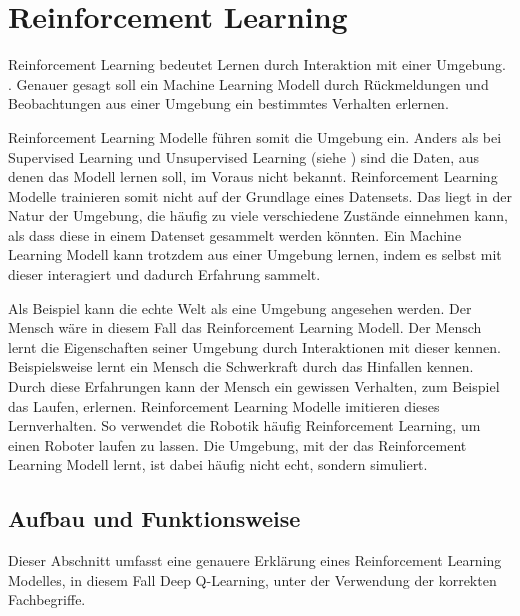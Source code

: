 \section{Reinforcement Learning}\label{chap:t_rl}
Reinforcement Learning bedeutet Lernen durch Interaktion mit einer Umgebung.
\cite{osinski_what_2018}. Genauer gesagt soll ein Machine Learning Modell durch
Rückmeldungen und Beobachtungen aus einer Umgebung ein bestimmtes Verhalten
erlernen.

Reinforcement Learning Modelle führen somit die Umgebung ein. Anders als bei
Supervised Learning und Unsupervised Learning (siehe ) sind
die Daten, aus denen das Modell lernen soll, im Voraus nicht bekannt.
Reinforcement Learning Modelle trainieren somit nicht auf der Grundlage eines
Datensets. Das liegt in der Natur der Umgebung, die häufig zu viele verschiedene
Zustände einnehmen kann, als dass diese in einem Datenset gesammelt werden
könnten. Ein Machine Learning Modell kann trotzdem aus einer Umgebung lernen,
indem es selbst mit dieser interagiert und dadurch Erfahrung sammelt.
\cite{piyush_verma_what_2021}

Als Beispiel kann die echte Welt als eine Umgebung angesehen werden. Der Mensch
wäre in diesem Fall das Reinforcement Learning Modell. Der Mensch lernt die
Eigenschaften seiner Umgebung durch Interaktionen mit dieser kennen.
Beispielsweise lernt ein Mensch die Schwerkraft durch das Hinfallen kennen.
Durch diese Erfahrungen kann der Mensch ein gewissen Verhalten, zum Beispiel das
Laufen, erlernen. Reinforcement Learning Modelle imitieren dieses Lernverhalten.
So verwendet die Robotik häufig Reinforcement Learning, um einen Roboter laufen
zu lassen. Die Umgebung, mit der das Reinforcement Learning Modell lernt, ist
dabei häufig nicht echt, sondern simuliert.

\subsection{Aufbau und Funktionsweise}\label{sub:t_rl_func}
Dieser Abschnitt umfasst eine genauere Erklärung eines Reinforcement Learning
Modelles, in diesem Fall Deep Q-Learning, unter der Verwendung der korrekten
Fachbegriffe.


